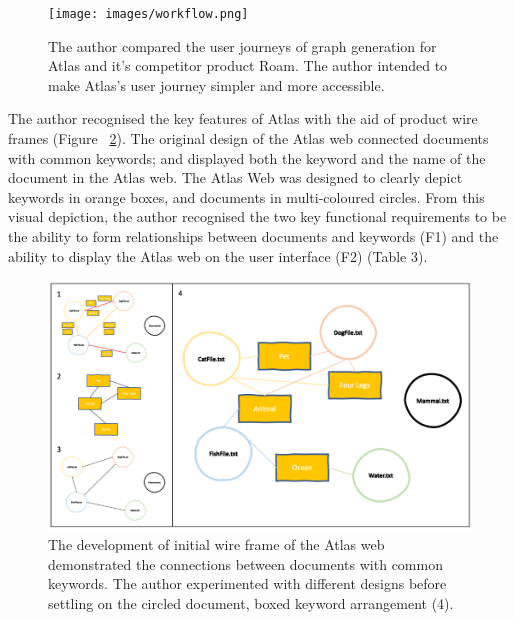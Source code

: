 \documentclass{article}
\begin{document}
\begin{figure}[!t]
  \centering
      \texttt{[image: images/workflow.png]}
  \caption{The author compared the user journeys of graph generation for Atlas and it's competitor product Roam. The author intended to make Atlas's user journey simpler and more accessible.}
  \vspace*{4in}
  \label{fig:competitor}
\end{figure}

The author recognised the key features of Atlas with the aid of product wire frames (Figure ~\ref{fig:wireframe}). The original design of the Atlas web connected documents with common keywords; and displayed both the keyword and the name of the document in the Atlas web. The Atlas Web was designed to clearly depict keywords in orange boxes, and documents in multi-coloured circles. From this visual depiction, the author recognised the two key functional requirements to be the ability to form relationships between documents and keywords (F1) and the ability to display the Atlas web on the user interface (F2) (Table 3).

\clearpage

\begin{figure}[!t]
  \centering
      \includegraphics[width=1\textwidth]{images/wireframe.png}
  \caption{The development of initial wire frame of the Atlas web demonstrated the connections between documents with common keywords. The author experimented with different designs before settling on the circled document, boxed keyword arrangement (4).}
    \label{fig:wireframe}
\end{figure}
\end{document}

